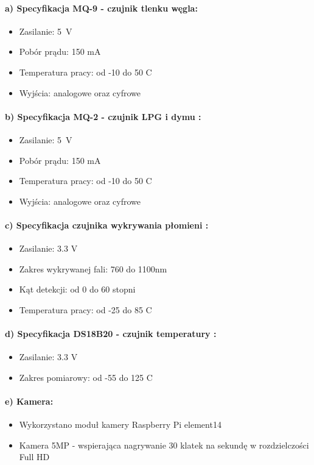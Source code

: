 \paragraph{a) Specyfikacja MQ-9 - czujnik tlenku węgla\cite{specyfikacjaMQ-9}:}
\begin{itemize} 
\item Zasilanie: 5~V
\item Pobór prądu: 150 mA
\item Temperatura pracy: od -10 do 50 \textdegree{}C
\item Wyjścia: analogowe oraz cyfrowe
\end{itemize}
\paragraph{b) Specyfikacja MQ-2 - czujnik LPG i dymu \protect\cite{specyfikacjaMQ-2}:}
\begin{itemize} 
\item Zasilanie: 5~V
\item Pobór prądu: 150 mA
\item Temperatura pracy: od -10 do 50 \textdegree{}C
\item Wyjścia: analogowe oraz cyfrowe
\end{itemize}
\paragraph{c) Specyfikacja czujnika wykrywania płomieni \protect\cite{specyfikacjaFlame}:}
\begin{itemize} 
\item Zasilanie: 3.3 V
\item Zakres wykrywanej fali: 760 do 1100nm
\item Kąt detekcji: od 0 do 60 stopni
\item Temperatura pracy: od -25 do 85 \textdegree{}C
\end{itemize}
\paragraph{d) Specyfikacja DS18B20 - czujnik temperatury \protect\cite{specyfikacjaTemp}:}
\begin{itemize} 
\item Zasilanie: 3.3 V
\item Zakres pomiarowy: od -55 do 125 \textdegree{}C
\end{itemize}
\paragraph{e) Kamera:}
\begin{itemize} 
\item Wykorzystano moduł kamery Raspberry Pi element14
\item Kamera 5MP - wspierająca nagrywanie 30 klatek na sekundę w rozdzielczości Full HD
\end{itemize}
